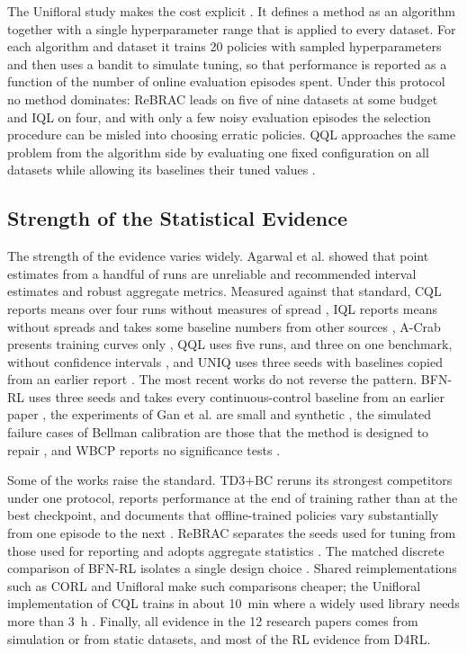 \documentclass[journal]{IEEEtran}
\begin{document}
The Unifloral study makes the cost explicit \cite{jackson2025unifloral}. It defines a method as an algorithm together with a single hyperparameter range that is applied to every dataset. For each algorithm and dataset it trains 20 policies with sampled hyperparameters and then uses a bandit to simulate tuning, so that performance is reported as a function of the number of online evaluation episodes spent. Under this protocol no method dominates: ReBRAC leads on five of nine datasets at some budget and IQL on four, and with only a few noisy evaluation episodes the selection procedure can be misled into choosing erratic policies. QQL approaches the same problem from the algorithm side by evaluating one fixed configuration on all datasets while allowing its baselines their tuned values \cite{gao2026qql}.

\subsection{Strength of the Statistical Evidence}
The strength of the evidence varies widely. Agarwal et al. \cite{agarwal2021precipice} showed that point estimates from a handful of runs are unreliable and recommended interval estimates and robust aggregate metrics. Measured against that standard, CQL reports means over four runs without measures of spread \cite{kumar2020cql}, IQL reports means without spreads and takes some baseline numbers from other sources \cite{kostrikov2022iql}, A-Crab presents training curves only \cite{zhu2023acrab}, QQL uses five runs, and three on one benchmark, without confidence intervals \cite{gao2026qql}, and UNIQ uses three seeds with baselines copied from an earlier report \cite{upadhyay2026uniq}. The most recent works do not reverse the pattern. BFN-RL uses three seeds and takes every continuous-control baseline from an earlier paper \cite{killingberg2026bfn}, the experiments of Gan et al. are small and synthetic \cite{gan2025conformal}, the simulated failure cases of Bellman calibration are those that the method is designed to repair \cite{vanderlaan2026bellman}, and WBCP reports no significance tests \cite{lou2026wbcp}.

Some of the works raise the standard. TD3+BC reruns its strongest competitors under one protocol, reports performance at the end of training rather than at the best checkpoint, and documents that offline-trained policies vary substantially from one episode to the next \cite{fujimoto2021td3bc}. ReBRAC separates the seeds used for tuning from those used for reporting and adopts aggregate statistics \cite{tarasov2023rebrac}. The matched discrete comparison of BFN-RL isolates a single design choice \cite{killingberg2026bfn}. Shared reimplementations such as CORL \cite{tarasov2023corl} and Unifloral make such comparisons cheaper; the Unifloral implementation of CQL trains in about 10~min where a widely used library needs more than 3~h \cite{jackson2025unifloral}. Finally, all evidence in the 12 research papers comes from simulation or from static datasets, and most of the RL evidence from D4RL.
\end{document}
